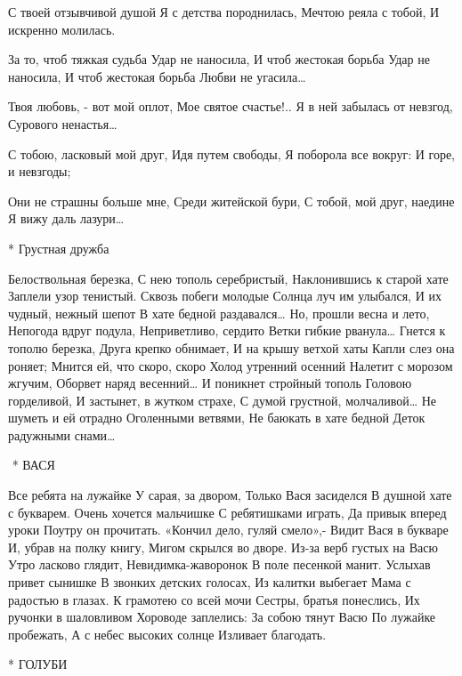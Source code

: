 С твоей отзывчивой душой
Я с детства породнилась,
Мечтою реяла с тобой,
И искренно молилась.

За то, чтоб тяжкая судьба
Удар не наносила,
И чтоб жестокая борьба
Удар не наносила,
И чтоб жестокая борьба
Любви не угасила…

Твоя любовь, - вот мой оплот,
Мое святое счастье!..
Я в ней забылась от невзгод,
Сурового ненастья…

С тобою, ласковый мой друг,
Идя путем свободы,
Я поборола все вокруг:
И горе, и невзгоды;

Они не страшны больше мне,
Среди житейской бури,
С тобой, мой друг, наедине
Я вижу даль лазури…


* Грустная дружба

Белоствольная березка,
С нею тополь серебристый,
Наклонившись к старой хате
Заплели узор тенистый.
Сквозь побеги молодые
Солнца луч им улыбался,
И их чудный, нежный шепот
В хате бедной раздавался…
Но, прошли весна и лето,
Непогода вдруг подула,
Неприветливо, сердито
Ветки гибкие рванула…
Гнется к тополю березка,
Друга крепко обнимает,
И на крышу ветхой хаты
Капли слез она роняет;
Мнится ей, что скоро, скоро
Холод утренний осенний
Налетит с морозом жгучим,
Оборвет наряд весенний…
И поникнет стройный тополь
Головою горделивой,
И застынет, в жутком страхе,
С думой грустной, молчаливой…
Не шуметь и ей отрадно
Оголенными ветвями,
Не баюкать в хате бедной
Деток радужными снами…

﻿
* ВАСЯ

Все ребята на лужайке
           У сарая, за двором,
Только Вася засиделся
           В душной хате с букварем.
Очень хочется мальчишке
           С ребятишками играть,
Да привык вперед уроки
           Поутру он прочитать.
«Кончил дело, гуляй смело»,-
            Видит Вася в букваре
И, убрав на полку книгу,
            Мигом скрылся во дворе.
Из-за верб густых на Васю
            Утро ласково глядит,
Невидимка-жаворонок
             В поле песенкой манит.
Услыхав привет сынишке
             В звонких детских голосах,
Из калитки выбегает
             Мама с радостью в глазах.
 К грамотею со всей мочи
             Сестры, братья понеслись,
Их ручонки в шаловливом
            Хороводе заплелись:
За собою тянут Васю
            По лужайке пробежать,
А с небес высоких солнце
            Изливает благодать.


* ГОЛУБИ

